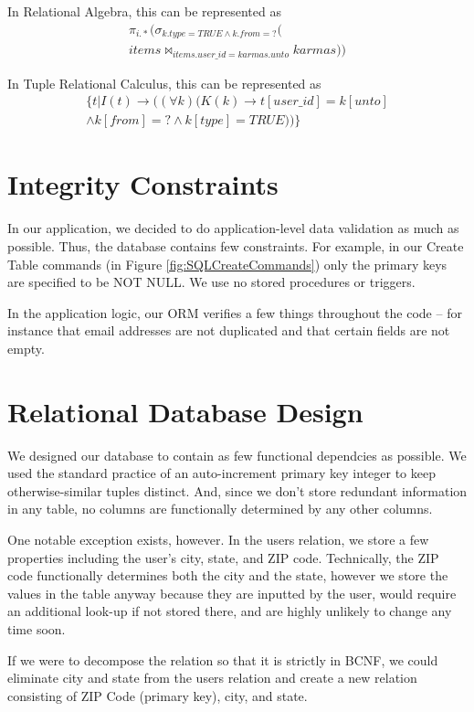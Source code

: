 \documentclass{acm_proc_article-sp}
\begin{document}
In Relational Algebra, this can be represented as
\[ \begin{split}
\pi_{i.*}(\sigma_{k.type=TRUE \land k.from=?}( \\
  items \bowtie_{items.user\_id=karmas.unto} karmas))
\end{split}\]

In Tuple Relational Calculus, this can be represented as
\[ 
\begin{split} \{ t | I(t) \to ((\forall k) (K(k) \to t[user\_id] = k[unto] \\
\land k[from] = ? \land k[type] = TRUE)) \} \end{split} \]
\section{Integrity Constraints}
In our application, we decided to do application-level data validation as much as possible. Thus, the database
contains few constraints. For example, in our Create Table commands (in Figure \ref{fig:SQLCreateCommands}) only
the primary keys are specified to be NOT NULL. We use no stored procedures or triggers.

In the application logic, our ORM verifies a few things throughout the code -- for instance that email addresses 
are not duplicated and that certain fields are not empty.

\section{Relational Database Design}
We designed our database to contain as few functional dependcies as possible. We used the standard practice of an
auto-increment primary key integer to keep otherwise-similar tuples distinct. And, since we don't store redundant information
in any table, no columns are functionally determined by any other columns.

One notable exception exists, however. In the users relation, we store a few properties including the user's city, state, and ZIP code. 
Technically, the ZIP code functionally determines both the city and the state, however we store the values in the table
anyway because they are inputted by the user, would require an additional look-up if not stored there, and are highly unlikely
to change any time soon. 

If we were to decompose the relation so that it is strictly in BCNF, we could eliminate city and state from the users
relation and create a new relation consisting of ZIP Code (primary key), city, and state.
\end{document}
